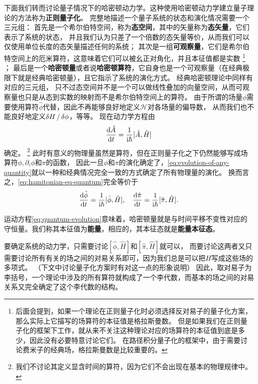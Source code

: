 \documentclass[hyperref, UTF8, a4paper]{ctexart}
\newcommand*{\ii}{\mathrm{i}}
\begin{document}
下面我们转而讨论量子情况下的哈密顿动力学。这种使用哈密顿动力学建立量子理论的方法称为\textbf{正则量子化}。
完整地描述一个量子系统的状态和演化情况需要一个三元组：
首先是一个希尔伯特空间，称为\textbf{态空间}，其中的矢量称为\textbf{态矢量}，它们表示了系统的状态，
并且我们认为只差了一个倍数的态矢量等价，从而我们可以仅使用单位长度的态矢量描述任何的系统；
其次是一组\textbf{可观察量}，它们是希尔伯特空间上的厄米算符，这意味着它们可以被幺正对角化，并且本征值都是实数%
\footnote{后面会提到，如果一个理论在正则量子化时必须选择反对易子的量子化方案，那么实际上它描写的场算符的本征值是格拉斯曼数。
但是如果我们在正则量子化的框架下工作，就从来不关注这种理论对应的场算符的本征值到底是多少，因此没有必要特意讨论它们。
在路径积分量子化的框架中，由于需要讨论费米子的经典场，格拉斯曼数是比较重要的。}%
；
最后是一个\textbf{哈密顿量}或者说\textbf{哈密顿算符}，它自身也是一个可观察量（在经典极限下就是经典哈密顿量），且它指示了系统的演化方式。
经典哈密顿理论中同样有对应的三元组，
只不过态空间并不是一个可以做线性叠加的向量空间，从而可观察量也只是从态到实数的映射而不是希尔伯特空间上的算符。
由于所谓的场量$\phi$需要使用算符$\hat{\phi}$代替，因此不再能够良好地定义$\mathcal{H}$对各场量的偏导数，
从而我们也不能良好地定义$\var{H}/\var{\phi}$，等等。
现在动力学方程由
\begin{equation}
    \dv{\hat{A}}{t} = \frac{1}{\ii \hbar} [\hat{A}, \hat{H}]
    \label{eq:quantum-evolution}
\end{equation}
确定。%
\footnote{我们不讨论其定义显含时间的算符，因为它们不会出现在基本的物理规律中。}%
此时有意义的物理量虽然是算符，但在正则量子化之下仍然能够写成场算符$\phi, \partial_i \phi$和$\pi$的函数，
因此一旦$\phi$和$\pi$的演化确定了，\eqref{eq:evolution-of-any-quantity}就以一种和经典情况完全一致的方式确定了所有物理量的演化。
换而言之，\eqref{eq:hamitonian-eq-quantum}完全等价于
\begin{equation}
    \dv{\hat{\phi}}{t} = \frac{1}{\ii \hbar} [\hat{\phi}, \hat{H}], 
    \quad \dv{\hat{\pi}}{t} = \frac{1}{\ii \hbar} [\hat{\pi}, \hat{H}].
    \label{eq:hamitonian-eq-quantum}
\end{equation}

运动方程\eqref{eq:quantum-evolution}意味着，哈密顿量就是与时间平移不变性对应的守恒量。我们称其本征值为\textbf{能量}，相应的，其本征态就是\textbf{能量本征态}。

要确定系统的动力学，只需要讨论$[\hat{\phi}, \hat{H}]$和$[\hat{\pi}, \hat{H}]$就可以，
而要讨论这两者又只需要讨论所有有关的场之间的对易关系即可，因为我们总是可以把$H$写成这些场的多项式。
（下文中讨论量子化方案时有对这一点的形象说明）
因此，取对易子为李括号，一个理论中涉及的所有算符就构成了一个李代数，而基本的场之间的对易关系又完全确定了这个李代数的结构。
\end{document}
